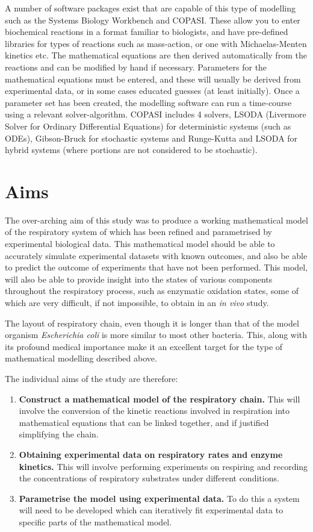 A number of software packages exist that are capable of this type of modelling such as the Systems Biology Workbench\cite{Sauro2003} and COPASI\cite{Hoops2006}. These allow you to enter biochemical reactions in a format familiar to biologists, and have pre-defined libraries for types of reactions such as mass-action, or one with Michaelas-Menten kinetics etc. The mathematical equations are then derived automatically from the reactions and can be modified by hand if necessary. Parameters for the mathematical equations must be entered, and these will usually be derived from experimental data, or in some cases educated guesses (at least initially). Once a parameter set has been created, the modelling software can run a time-course using a relevant solver-algorithm. COPASI includes 4 solvers,  LSODA (Livermore Solver for Ordinary Differential Equations)\cite{Radhakrishnan1993} for deterministic systems (such as ODEs), Gibson-Bruck\cite{Gibson2000} for stochastic systems and Runge-Kutta and LSODA for hybrid systems (where portions are not considered to be stochastic).

\section{Aims}
The over-arching aim of this study was to produce a working mathematical model of the respiratory system of \Nm{} which has been refined and parametrised by experimental biological data. This mathematical model should be able to accurately simulate experimental datasets with known outcomes, and also be able to predict the outcome of experiments that have not been performed. This model, will also be able to provide insight into the states of various components throughout the respiratory process, such as enzymatic oxidation states, some of which are very difficult, if not impossible, to obtain in an \textit{in vivo} study.

The layout of \Nm{} respiratory chain, even though it is longer than that of the model organism \textit{Escherichia coli} is more similar to most other bacteria. This, along with its profound medical importance make it an excellent target for the type of mathematical modelling described above.

The individual aims of the study are therefore:
\begin{enumerate}
\item {\bf Construct a mathematical model of the \Nm{} respiratory chain.} This will involve the conversion of the kinetic reactions involved in respiration into mathematical equations that can be linked together, and if justified simplifying the chain.
\item {\bf Obtaining experimental data on respiratory rates and enzyme kinetics.} This will involve performing experiments on respiring \Nm{} and recording the concentrations of respiratory substrates under different conditions.
\item {\bf Parametrise the model using experimental data.} To do this a system will need to be developed which can iteratively fit experimental data to specific parts of the mathematical model.
\end{enumerate}